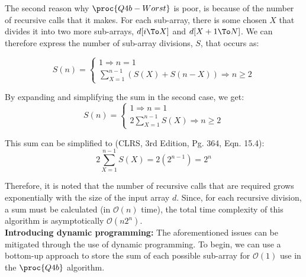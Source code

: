     The second reason why $\proc{Q4b-Worst}$ is poor, is because of the number of recursive calls that it makes.
    For each sub-array, there is some chosen $X$ that divides it into two more sub-arrays, $d[i \To X]$ and $d[X + 1 \To N]$.
    We can therefore express the number of sub-array divisions, $S$, that occurs as:
    
    \[S(n) = \begin{cases}
            1 \Rightarrow n = 1 \\
            \sum_{X=1}^{n - 1}(S(X) + S(n - X)) \Rightarrow n \ge 2
    \end{cases}\]

    By expanding and simplifying the sum in the second case, we get:
    \[S(n) = \begin{cases}
        1 \Rightarrow n = 1 \\
        2\sum_{X=1}^{n - 1}S(X) \Rightarrow n \ge 2
    \end{cases}\]

    This sum can be simplified to (CLRS, 3rd Edition, Pg. 364, Eqn. 15.4):
    \[2\sum_{X=1}^{n - 1}S(X) = 2(2^{n-1}) = 2^n\]

    Therefore, it is noted that the number of recursive calls that are required grows exponentially with the size of the input array $d$.
    Since, for each recursive division, a sum must be calculated (in $\mathcal{O}(n)$ time), the total time complexity of this algorithm is asymptotically $\mathcal{O}(n2^n)$.\\

    \textbf{Introducing dynamic programming:}
    The aforementioned issues can be mitigated through the use of dynamic programming.
    To begin, we can use a bottom-up approach to store the sum of each possible sub-array for $\mathcal{O}(1)$ use in the $\proc{Q4b}$ algorithm.

